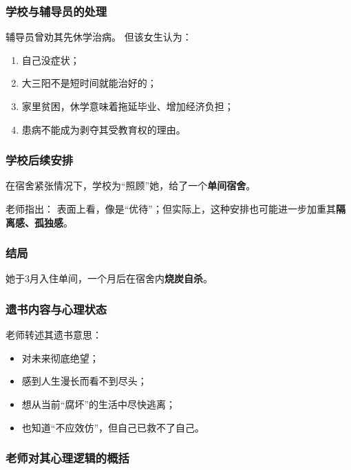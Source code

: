 \documentclass[
  chinese,
  9pt,
  a4paper,
]{ctexart}
\providecommand{\tightlist}{%
  \setlength{\itemsep}{0pt}\setlength{\parskip}{0pt}}
\begin{document}
\subsubsection{学校与辅导员的处理}\label{ux5b66ux6821ux4e0eux8f85ux5bfcux5458ux7684ux5904ux7406}

辅导员曾劝其先休学治病。 但该女生认为：

\begin{enumerate}
\def\labelenumi{\arabic{enumi}.}
\tightlist
\item
  自己没症状；
\item
  大三阳不是短时间就能治好的；
\item
  家里贫困，休学意味着拖延毕业、增加经济负担；
\item
  患病不能成为剥夺其受教育权的理由。
\end{enumerate}

\subsubsection{学校后续安排}\label{ux5b66ux6821ux540eux7eedux5b89ux6392}

在宿舍紧张情况下，学校为``照顾''她，给了一个\textbf{单间宿舍}。

老师指出：
表面上看，像是``优待''；但实际上，这种安排也可能进一步加重其\textbf{隔离感、孤独感}。

\subsubsection{结局}\label{ux7ed3ux5c40}

她于3月入住单间，一个月后在宿舍内\textbf{烧炭自杀}。

\subsubsection{遗书内容与心理状态}\label{ux9057ux4e66ux5185ux5bb9ux4e0eux5fc3ux7406ux72b6ux6001}

老师转述其遗书意思：

\begin{itemize}
\tightlist
\item
  对未来彻底绝望；
\item
  感到人生漫长而看不到尽头；
\item
  想从当前``腐坏''的生活中尽快逃离；
\item
  也知道``不应效仿''，但自己已救不了自己。
\end{itemize}

\subsubsection{老师对其心理逻辑的概括}\label{ux8001ux5e08ux5bf9ux5176ux5fc3ux7406ux903bux8f91ux7684ux6982ux62ec}
\end{document}
